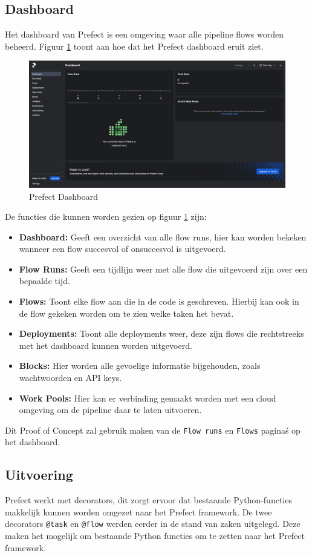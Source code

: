 \subsection{Dashboard}
Het dashboard van Prefect is een omgeving waar alle pipeline flows worden beheerd. Figuur \ref{fig:Prefect_Dashboard} toont aan hoe dat het Prefect dashboard eruit ziet.
\begin{figure}[htbp]
    \centering
    \includegraphics[width=0.9\linewidth]{graphics/Prefect_dashboard.PNG}
    \caption{Prefect Dashboard}
    \label{fig:Prefect_Dashboard}
\end{figure}
De functies die kunnen worden gezien op figuur \ref{fig:Prefect_Dashboard} zijn:
\begin{itemize}
    \item \textbf{Dashboard:} Geeft een overzicht van alle flow runs, hier kan worden bekeken wanneer een flow succesvol of onsuccesvol is uitgevoerd.
    \item \textbf{Flow Runs:} Geeft een tijdlijn weer met alle flow die uitgevoerd zijn over een bepaalde tijd.
    \item \textbf{Flows:} Toont elke flow aan die in de code is geschreven. Hierbij kan ook in de flow gekeken worden om te zien welke taken het bevat.
    \item \textbf{Deployments:} Toont alle deployments weer, deze zijn flows die rechtstreeks met het dashboard kunnen worden uitgevoerd.
    \item \textbf{Blocks:} Hier worden alle gevoelige informatie bijgehouden, zoals wachtwoorden en API keys.
    \item \textbf{Work Pools:} Hier kan er verbinding gemaakt worden met een cloud omgeving om de pipeline daar te laten uitvoeren.
\end{itemize}
Dit Proof of Concept zal gebruik maken van de \verb+Flow runs+ en \verb+Flows+ pagina\'s op het dashboard.
\subsection{Uitvoering}
Prefect werkt met decorators, dit zorgt ervoor dat bestaande Python-functies makkelijk kunnen worden omgezet naar het Prefect framework. De twee decorators \verb+@task+ en \verb+@flow+ werden eerder in de stand van zaken uitgelegd. Deze maken het mogelijk om bestaande Python functies om te zetten naar het Prefect framework.

